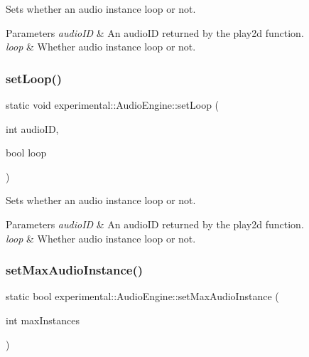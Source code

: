 Sets whether an audio instance loop or not.


\begin{DoxyParams}{Parameters}
{\em audio\+ID} & An audio\+ID returned by the play2d function. \\
\hline
{\em loop} & Whether audio instance loop or not. \\
\hline
\end{DoxyParams}
\mbox{\label{classexperimental_1_1AudioEngine_a4d9aa8312f064b9bcdc06888c4306c23}} 
\subsubsection{\texorpdfstring{set\+Loop()}{setLoop()}\hspace{0.1cm}{\footnotesize\ttfamily [2/2]}}
{\footnotesize\ttfamily static void experimental\+::\+Audio\+Engine\+::set\+Loop (\begin{DoxyParamCaption}\item[{int}]{audio\+ID,  }\item[{bool}]{loop }\end{DoxyParamCaption})\hspace{0.3cm}{\ttfamily [static]}}

Sets whether an audio instance loop or not.


\begin{DoxyParams}{Parameters}
{\em audio\+ID} & An audio\+ID returned by the play2d function. \\
\hline
{\em loop} & Whether audio instance loop or not. \\
\hline
\end{DoxyParams}
\mbox{\label{classexperimental_1_1AudioEngine_a98a3cd56d393541c2c9d82620bbe0d84}} 
\subsubsection{\texorpdfstring{set\+Max\+Audio\+Instance()}{setMaxAudioInstance()}\hspace{0.1cm}{\footnotesize\ttfamily [1/2]}}
{\footnotesize\ttfamily static bool experimental\+::\+Audio\+Engine\+::set\+Max\+Audio\+Instance (\begin{DoxyParamCaption}\item[{int}]{max\+Instances }\end{DoxyParamCaption})\hspace{0.3cm}{\ttfamily [static]}}

